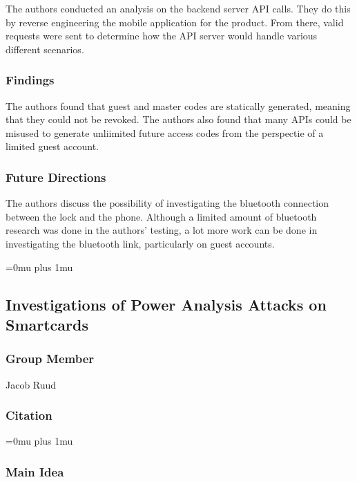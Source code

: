 \noindent
The authors conducted an analysis on the backend server API calls.  They do this by reverse engineering the mobile application for the product.  From there, valid requests were sent to determine how the API server would handle various different scenarios.

\subsubsection{Findings}

\noindent
The authors found that guest and master codes are statically generated, meaning that they could not be revoked.  The authors also found that many APIs could be misused to generate unliimited future access codes from the perspectie of a limited guest account.

\subsubsection{Future Directions}

\noindent
The authors discuss the possibility of investigating the bluetooth connection between the lock and the phone.  Although a limited amount of bluetooth research was done in the authors' testing, a lot more work can be done in investigating the bluetooth link, particularly on guest accounts.

\Urlmuskip=0mu plus 1mu\relax

\noindent
\subsection{{I}nvestigations of {P}ower {A}nalysis {A}ttacks on {S}martcards}

\subsubsection{Group Member}

\noindent
Jacob Ruud

\noindent
\subsubsection{Citation}

\Urlmuskip=0mu plus 1mu\relax

\subsubsection{Main Idea}


